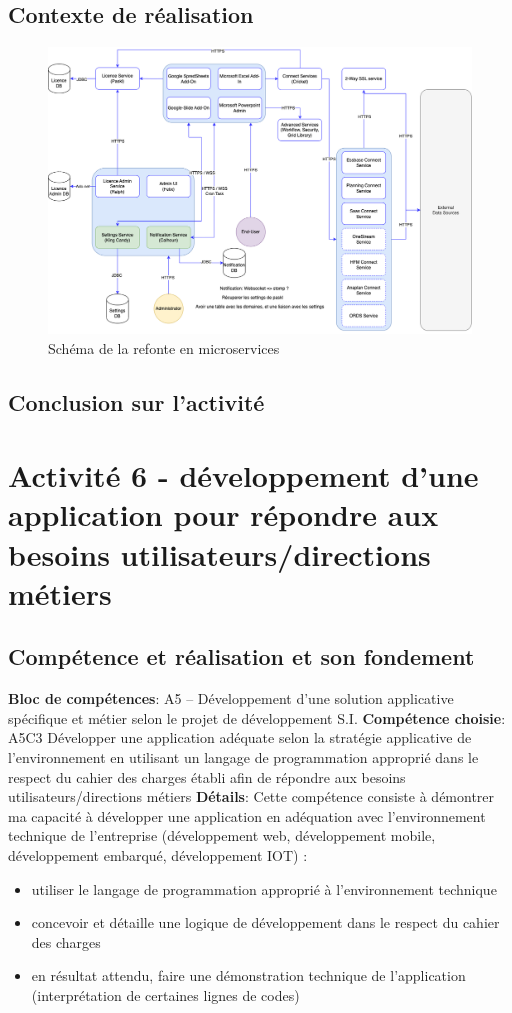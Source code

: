 \documentclass[a4paper, 11pt]{report}
\begin{document}
\subsection{Contexte de réalisation}
  \begin{figure}[h]
      \centering
      \includegraphics[scale=0.40,center]{schemas/schema-qibates-v2.png}
      \caption{Schéma de la refonte en microservices}
  \end{figure}
\subsection{Conclusion sur l'activité}

\section{Activité 6 - développement d'une application pour répondre aux besoins utilisateurs/directions métiers}
\subsection{Compétence et réalisation et son fondement}
\textbf{Bloc de compétences}: A5 – Développement d’une solution applicative spécifique et métier selon le projet de développement S.I.
\newline
\textbf{Compétence choisie}: A5C3 Développer une application adéquate selon la stratégie applicative de l’environnement en utilisant un langage de programmation approprié dans le respect du cahier des charges établi afin de répondre aux besoins utilisateurs/directions métiers
\newline
\textbf{Détails}: Cette compétence consiste à démontrer ma capacité à développer une application en
adéquation avec l’environnement technique de l’entreprise (développement web, développement mobile, développement embarqué, développement IOT) :
\begin{itemize} 
 \item utiliser le langage de programmation approprié à l’environnement technique
 \item concevoir et détaille une logique de développement dans le respect du cahier des charges
 \item en résultat attendu, faire une démonstration technique de l'application (interprétation de certaines lignes de codes)
\end{itemize}
\end{document}
